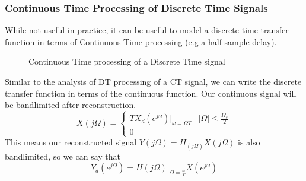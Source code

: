 \subsubsection{Continuous Time Processing of Discrete Time Signals}
While not useful in practice, it can be useful to model a discrete time transfer function in terms of Continuous Time processing (e.g a half sample delay).
\begin{gitbook-image}
\begin{figure}[H]
  \centering
  \caption{Continuous Time processing of a Discrete Time signal}
  \label{fig:ct-dt-processing}
\end{figure}
\end{gitbook-image}
Similar to the analysis of DT processing of a CT signal, we can write the discrete transfer function in terms of the continuous function.
Our continuous signal will be bandlimited after reconstruction.
\[
  X(j\Omega) = \begin{cases}
    T X_d(e^{j\omega})|_{\omega=\Omega T} & |\Omega| \le \frac{\Omega_s}{2}\\
    0
  \end{cases}
\]
This means our reconstructed signal $Y(j\Omega)=H_(j\Omega)X(j\Omega)$ is also bandlimited, so we can say that
\[
  Y_d(e^{j\Omega})=H(j\Omega)|_{\Omega=\frac{\omega}{T}}X(e^{j\omega})
\]
